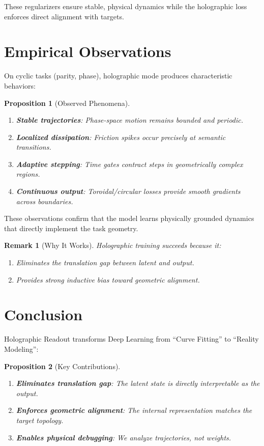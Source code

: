 \documentclass[12pt,letterpaper,twoside]{article}
\newtheorem{remarque}{Remark}[section]
\newtheorem{prop}{Proposition}[section]
\begin{document}
These regularizers ensure stable, physical dynamics while the holographic loss enforces direct alignment with targets.

\section{Empirical Observations}

On cyclic tasks (parity, phase), holographic mode produces characteristic behaviors:

\begin{prop}[Observed Phenomena]
\begin{enumerate}
\item \textbf{Stable trajectories}: Phase-space motion remains bounded and periodic.
\item \textbf{Localized dissipation}: Friction spikes occur precisely at semantic transitions.
\item \textbf{Adaptive stepping}: Time gates contract steps in geometrically complex regions.
\item \textbf{Continuous output}: Toroidal/circular losses provide smooth gradients across boundaries.
\end{enumerate}
\end{prop}

These observations confirm that the model learns physically grounded dynamics that directly implement the task geometry.

\begin{remarque}[Why It Works]
Holographic training succeeds because it:
\begin{enumerate}
\item Eliminates the translation gap between latent and output.
\item Provides strong inductive bias toward geometric alignment.
\end{enumerate}
\end{remarque}

\section{Conclusion}

Holographic Readout transforms Deep Learning from ``Curve Fitting'' to ``Reality Modeling'':

\begin{prop}[Key Contributions]
\begin{enumerate}
\item \textbf{Eliminates translation gap}: The latent state is directly interpretable as the output.
\item \textbf{Enforces geometric alignment}: The internal representation matches the target topology.
\item \textbf{Enables physical debugging}: We analyze trajectories, not weights.
\end{enumerate}
\end{prop}
\end{document}
